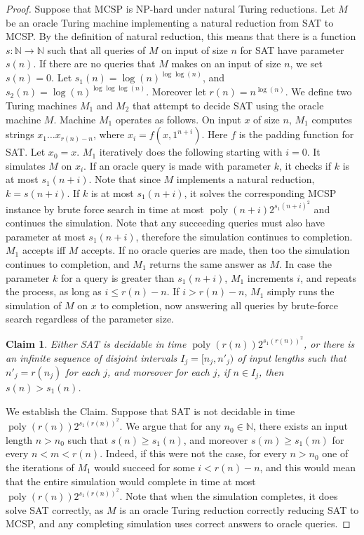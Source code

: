 \documentclass[10pt,a4paper]{article}
\newtheorem*{ntclaim}{Claim}
\newcommand{\poly}{\operatorname{poly}}
\begin{document}
\begin{proof}
Suppose that MCSP is NP-hard under natural Turing reductions. Let $M$ be an oracle Turing machine implementing a natural reduction from SAT to MCSP. By the definition of natural reduction, this means that there is a function $s:\mathbb N\to\mathbb N$ such that all queries of $M$ on input of size $n$ for SAT have parameter $s(n)$. If there are no queries that $M$ makes on an input of size $n$, we set $s(n)=0$.
Let $s_1(n)=\log(n)^{\log\log(n)}$, and $s_2(n)=\log(n)^{\log\log\log(n)}$. Moreover let $r(n)=n^{\log(n)}$. We define two Turing machines $M_1$ and $M_2$ that attempt to decide SAT using the oracle machine $M$.
Machine $M_1$ operates as follows. On input $x$ of size $n$, $M_1$ computes strings $x_1\ldots x_{r(n)-n}$, where $x_i=f(x,1^{n+i})$. Here $f$ is the padding function for SAT. Let $x_0=x$. $M_1$ iteratively does the following starting with $i=0$. It simulates $M$ on $x_i$. If an oracle query is made with parameter $k$, it checks if $k$ is at most $s_1(n+i)$. Note that since $M$ implements a natural reduction, $k=s(n+i)$. If $k$ is at most $s_1(n+i)$, it solves the corresponding MCSP instance by brute force search in time at most $\poly(n+i)2^{s_1(n+i)^2}$ and continues the simulation. Note that any succeeding queries must also have parameter at most $s_1(n+i)$, therefore the simulation continues to completion. $M_1$ accepts iff $M$ accepts. If no oracle queries are made, then too the simulation continues to completion, and $M_1$ returns the same answer as $M$.
In case the parameter $k$ for a query is greater than $s_1(n+i)$, $M_1$ increments $i$, and repeats the process, as long as $i\leq r(n)-n$. If $i>r(n)-n$, $M_1$ simply runs the simulation of $M$ on $x$ to completion, now answering all queries by brute-force search regardless of the parameter size.
\begin{ntclaim}
Either SAT is decidable in time $\poly(r(n))2^{s_1(r(n))^2}$, or there is an infinite sequence of disjoint intervals $I_j=[n_j,n'_j)$ of input lengths such that $n'_j=r(n_j)$ for each $j$, and moreover for each $j$, if $n\in I_j$, then $s(n)>s_1(n)$.
\end{ntclaim}
We establish the Claim. Suppose that SAT is not decidable in time $\poly(r(n))2^{s_1(r(n))^2}$. We argue that for any $n_0\in\mathbb N$, there exists an input length $n>n_0$ such that $s(n)\geq s_1(n)$, and moreover $s(m)\geq s_1(m)$ for every $n<m<r(n)$. Indeed, if this were not the case, for every $n>n_0$ one of the iterations of $M_1$ would succeed for some $i<r(n)-n$, and this would mean that the entire simulation would complete in time at most $\poly(r(n))2^{s_1(r(n))^2}$. Note that when the simulation completes, it does solve SAT correctly, as $M$ is an oracle Turing reduction correctly reducing SAT to MCSP, and any completing simulation uses correct answers to oracle queries.

\end{proof}
\end{document}
